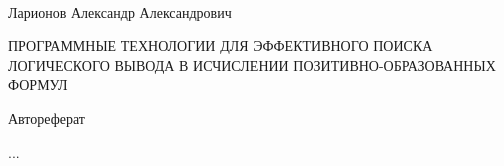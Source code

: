 \documentclass[a4paper]{report}
\begin{document}





\newpage
\mbox{~}
\vfill{}
\begin{center}

Ларионов Александр Александрович

ПРОГРАММНЫЕ ТЕХНОЛОГИИ ДЛЯ ЭФФЕКТИВНОГО ПОИСКА ЛОГИЧЕСКОГО ВЫВОДА В ИСЧИСЛЕНИИ ПОЗИТИВНО-ОБРАЗОВАННЫХ ФОРМУЛ

Автореферат

...
\end{center}
\vspace{1cm}{}
\mbox{~}
%
%
%
%
%

%

%
\end{document}
